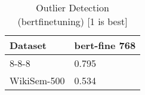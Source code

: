 \begin{table}[]
\centering
\begin{tabular}{l|l}
\hline
Dataset & bert-fine 768 \\
\hline
8-8-8 & 0.795 \\ 
WikiSem-500 & 0.534
\end{tabular}
\caption{Outlier Detection (bertfinetuning) [1 is best]}
\label{tab:outlier-bertfinetuning}
\end{table}
